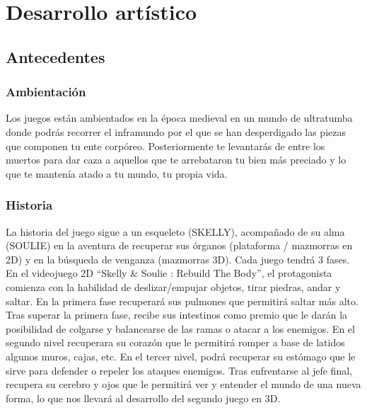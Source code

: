 \documentclass[12pt,a4paper,twoside,spanish]{article}      %
\begin{document}
\setlength{\parindent}{1,5cm} \setlength{\parskip}{0,7cm}



\section{Desarrollo artístico}

\subsection{Antecedentes}
\subsubsection{Ambientación}
Los juegos están ambientados en la época medieval en un mundo de ultratumba donde podrás recorrer el inframundo por el que se han desperdigado las piezas que componen tu ente corpóreo. Posteriormente te levantarás de entre los muertos para dar caza a aquellos que te arrebataron tu bien más preciado y lo que te mantenía atado a tu mundo, tu propia vida.

\subsubsection{Historia}
La historia del juego sigue a un esqueleto (SKELLY), acompañado de su alma (SOULIE) en la aventura de recuperar sus órganos (plataforma / mazmorras en 2D) y en la búsqueda de venganza (mazmorras 3D). Cada juego tendrá 3 fases.\\

En el videojuego 2D “Skelly \& Soulie : Rebuild The Body”, el protagonista comienza con la habilidad de deslizar/empujar objetos, tirar piedras, andar y saltar. En la primera fase recuperará sus pulmones que permitirá saltar más alto. Tras superar la primera fase, recibe sus intestinos como premio que le darán la posibilidad de colgarse y balancearse de las ramas o atacar a los enemigos. En el segundo nivel recuperara su corazón que le permitirá romper a base de latidos algunos muros, cajas, etc. En el tercer nivel, podrá recuperar su estómago que le sirve para defender o repeler los ataques enemigos. Tras enfrentarse al jefe final, recupera su cerebro y ojos que le permitirá ver y entender el mundo de una nueva forma, lo que nos llevará al desarrollo del segundo juego en 3D.\\
\end{document}
